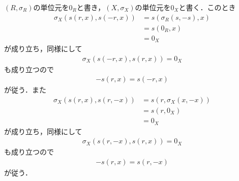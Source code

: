 	\begin{sketch}
		$(R,\sigma_R)$の単位元を$0_R$と書き，$(X,\sigma_X)$の単位元を$0_X$と書く．このとき
		\begin{align}
			\sigma_X\left(s(r,x),s\left(-r,x\right)\right) 
			&= s\left(\sigma_R\left(s,-s\right),x\right) \\
			&= s\left(0_R,x\right) \\
			&= 0_X
		\end{align}
		が成り立ち，同様にして
		\begin{align}
			\sigma_X\left(s(-r,x),s\left(r,x\right)\right) = 0_X
		\end{align}
		も成り立つので
		\begin{align}
			-s(r,x) = s\left(-r,x\right)
		\end{align}
		が従う．また
		\begin{align}
			\sigma_X\left(s(r,x),s\left(r,-x\right)\right) 
			&= s\left(r,\sigma_X(x,-x)\right) \\
			&= s\left(r,0_X\right) \\
			&= 0_X
		\end{align}
		が成り立ち，同様にして
		\begin{align}
			\sigma_X\left(s(r,-x),s\left(r,x\right)\right) = 0_X
		\end{align}
		も成り立つので
		\begin{align}
			-s(r,x) = s\left(r,-x\right)
		\end{align}
		が従う．
		\QED
	\end{sketch}
	
	\begin{screen}
		\begin{dfn}[加群準同型]
			
		\end{dfn}
	\end{screen}